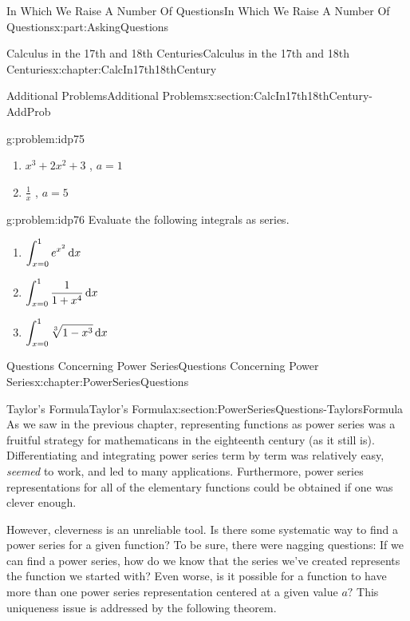 \documentclass[oneside,10pt,]{book}
\numberwithin{equation}{section}
\newcommand{\dx}[1]{\,{\rm d}#1}
\begin{document}
\begin{partptx}{In Which We Raise A Number Of Questions}{}{In Which We Raise A Number Of Questions}{}{}{x:part:AskingQuestions}
\begin{chapterptx}{Calculus in the 17th and 18th Centuries}{}{Calculus in the 17th and 18th Centuries}{}{}{x:chapter:CalcIn17th18thCentury}
\begin{sectionptx}{Additional Problems}{}{Additional Problems}{}{}{x:section:CalcIn17th18thCentury-AddProb}
\begin{problem}{}{g:problem:idp75}
\begin{enumerate}[font=\bfseries,label=(\alph*),ref=\alph*]
\item{}\(x^3+2x^2+3\) , \(a=1\)%
\item{}\(\frac{1}{x}\) , \(a=5\)%
\end{enumerate}
\end{problem}
\begin{problem}{}{g:problem:idp76}%
 Evaluate the following integrals as series.%
\begin{enumerate}[font=\bfseries,label=(\alph*),ref=\alph*]
\item{}\(\displaystyle\int_{x=0}^1e^{x^2}\dx{ x}\)%
\item{}\(\displaystyle\int_{x=0}^1\frac{1}{1+x^4}\dx{ x}\)%
\item{}\(\displaystyle\int_{x=0}^1\sqrt[3]{1-x^3}\dx{ x}\)%
\end{enumerate}
\end{problem}
\end{sectionptx}
\end{chapterptx}
%
\typeout{************************************************}
\typeout{************************************************}
%
\begin{chapterptx}{Questions Concerning Power Series}{}{Questions Concerning Power Series}{}{}{x:chapter:PowerSeriesQuestions}
%
%
\typeout{************************************************}
\typeout{************************************************}
%
\begin{sectionptx}{Taylor's Formula}{}{Taylor's Formula}{}{}{x:section:PowerSeriesQuestions-TaylorsFormula}
As we saw in the previous chapter, representing functions as power series was a fruitful strategy for mathematicans in the eighteenth century (as it still is). Differentiating and integrating power series term by term was relatively easy, \emph{seemed} to work, and led to many applications. Furthermore, power series representations for all of the elementary functions could be obtained if one was clever enough.%
\par
However, cleverness is an unreliable tool. Is there some systematic way to find a power series for a given function? To be sure, there were nagging questions: If we can find a power series, how do we know that the series we've created represents the function we started with? Even worse, is it possible for a function to have more than one power series representation centered at a given value \(a?\) This uniqueness issue is addressed by the following theorem.%

\end{sectionptx}
\end{chapterptx}
\end{partptx}
\end{document}
